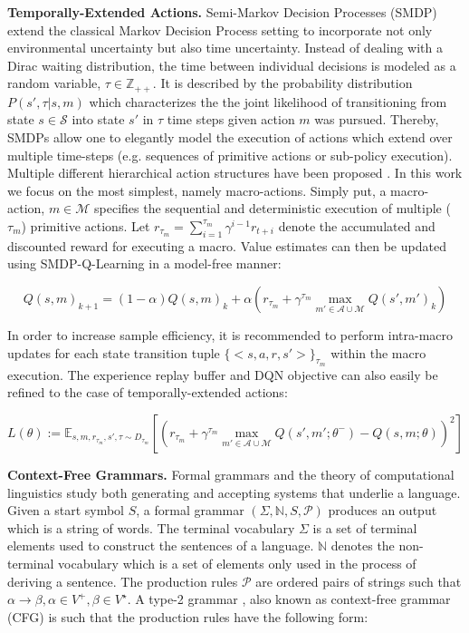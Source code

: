 \documentclass[colorinlistoftodos]{article}
\theoremstyle{definition}
\begin{document}
\textbf{Temporally-Extended Actions.} Semi-Markov Decision Processes (SMDP) extend the classical Markov Decision Process setting to incorporate not only environmental uncertainty but also time uncertainty. Instead of dealing with a Dirac waiting distribution, the time between individual decisions is modeled as a random variable, $\tau \in \mathbb{Z}_{++}$. It is described by the probability distribution $P(s', \tau| s, m)$  which characterizes the the joint likelihood of transitioning from state $s \in \mathcal{S}$ into state $s'$ in $\tau$ time steps given action $m$ was pursued. Thereby, SMDPs allow one to elegantly model the execution of actions which extend over multiple time-steps (e.g. sequences of primitive actions or sub-policy execution). Multiple different hierarchical action structures have been proposed \citep{McGovern_1997, Sutton_1999, Parr_1998b, Dayan_1993}. In this work we focus on the most simplest, namely macro-actions. Simply put, a macro-action, $m \in \mathcal{M}$ specifies the sequential and deterministic execution of multiple ($\tau_m$) primitive actions. Let $r_{\tau_m} = \sum_{i=1}^{\tau_m} \gamma^{i-1} r_{t+i}$ denote the accumulated and discounted reward for executing a macro. Value estimates can then be updated using SMDP-Q-Learning \citep{Parr_1998a} in a model-free manner:

$$Q(s, m)_{k+1} = (1-\alpha) Q(s, m)_k + \alpha \left( r_{\tau_m} + \gamma^{\tau_m} \max_{m' \in \mathcal{A} \cup \mathcal{M}} Q(s', m')_k \right)$$  

In order to increase sample efficiency, it is recommended to perform intra-macro updates for each state transition tuple $\{<s,a,r,s'>\}_{\tau_m}$ within the macro execution.
The experience replay buffer and DQN objective can also easily be refined to the case of temporally-extended actions:

$$L(\theta) := \mathbb{E}_{s,m,r_{\tau_m},s', \tau \sim D_{\tau_m}} [(r_{\tau_m} + \gamma^{\tau_m} \max_{m' \in \mathcal{A} \cup \mathcal{M}} Q(s',m';\theta^-) - Q(s,m; \theta))^2] $$

\textbf{Context-Free Grammars.} Formal grammars and the theory of computational linguistics study both generating and accepting systems that underlie a language. Given a start symbol $S$, a formal grammar $(\Sigma, \mathbb{N}, S, \mathcal{P})$ produces an output which is a string of words. The terminal vocabulary $\Sigma$ is a set of terminal elements used to construct the sentences of a language. $\mathbb{N}$ denotes the non-terminal vocabulary which is a set of elements only used in the process of deriving a sentence.
The production rules $\mathcal{P}$ are ordered pairs of strings such that $\alpha \to \beta, \alpha \in V^+, \beta \in V^\star$.
A type-2 grammar \citep{Chomsky_1959a, Chomsky_1959b}, also known as context-free grammar (CFG) is such that the production rules have the following form: 
 
\end{document}
